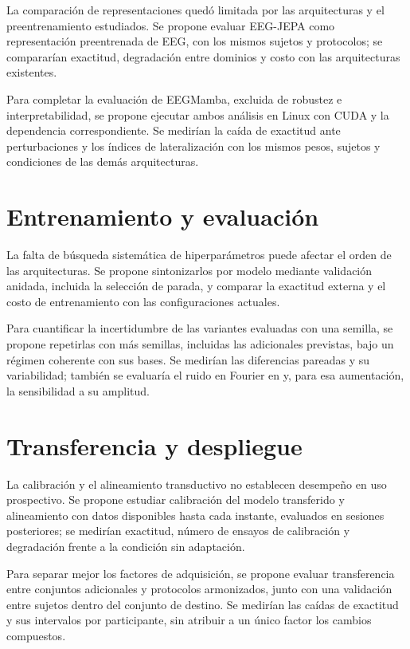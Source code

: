La comparación de representaciones quedó limitada por las arquitecturas y el preentrenamiento estudiados. Se propone evaluar EEG-JEPA \cite{li2026eegjepa} como representación preentrenada de EEG, con los mismos sujetos y protocolos; se compararían exactitud, degradación entre dominios y costo con las arquitecturas existentes.

Para completar la evaluación de EEGMamba, excluida de robustez e interpretabilidad, se propone ejecutar ambos análisis en Linux con CUDA y la dependencia correspondiente. Se medirían la caída de exactitud ante perturbaciones y los índices de lateralización con los mismos pesos, sujetos y condiciones de las demás arquitecturas.

\section{Entrenamiento y evaluación}
\label{sec:tf-entrenamiento}

La falta de búsqueda sistemática de hiperparámetros puede afectar el orden de las arquitecturas. Se propone sintonizarlos por modelo mediante validación anidada, incluida la selección de parada, y comparar la exactitud externa y el costo de entrenamiento con las configuraciones actuales.

Para cuantificar la incertidumbre de las variantes evaluadas con una semilla, se propone repetirlas con más semillas, incluidas las adicionales previstas, bajo un régimen coherente con sus bases. Se medirían las diferencias pareadas y su variabilidad; también se evaluaría el ruido en Fourier en \loso{} y, para esa aumentación, la sensibilidad a su amplitud.

\section{Transferencia y despliegue}
\label{sec:tf-transferencia}

La calibración y el alineamiento transductivo no establecen desempeño en uso prospectivo. Se propone estudiar calibración del modelo transferido y alineamiento con datos disponibles hasta cada instante, evaluados en sesiones posteriores; se medirían exactitud, número de ensayos de calibración y degradación frente a la condición sin adaptación.

Para separar mejor los factores de adquisición, se propone evaluar transferencia entre conjuntos adicionales y protocolos armonizados, junto con una validación entre sujetos dentro del conjunto de destino. Se medirían las caídas de exactitud y sus intervalos por participante, sin atribuir a un único factor los cambios compuestos.

